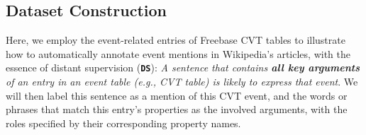 %

\subsection{Dataset Construction\label{datagen}}
Here, we employ the event-related entries of Freebase CVT tables to illustrate how to automatically annotate event mentions in Wikipedia's articles, with the essence of distant supervision (\textbf{\texttt{DS}}): \textit{A sentence that contains \textbf{all key arguments} of an entry in an event table (e.g., CVT table) is likely to express that event}.
We will then label this sentence as a mention of this CVT event, and the words or phrases that match this entry's properties as the involved arguments, with the roles specified by their corresponding property names.

